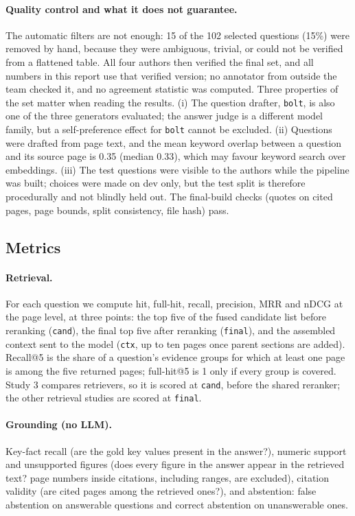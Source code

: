 \documentclass[11pt,a4paper]{article}
\begin{document}
\paragraph{Quality control and what it does not guarantee.} The automatic filters are not enough: 15 of the 102 selected questions (15\%) were removed by hand, because they were ambiguous, trivial, or could not be verified from a flattened table. All four authors then verified the final set, and all numbers in this report use that verified version; no annotator from outside the team checked it, and no agreement statistic was computed. Three properties of the set matter when reading the results. (i) The question drafter, \texttt{bolt}, is also one of the three generators evaluated; the answer judge is a different model family, but a self-preference effect for \texttt{bolt} cannot be excluded. (ii) Questions were drafted from page text, and the mean keyword overlap between a question and its source page is 0.35 (median 0.33), which may favour keyword search over embeddings. (iii) The test questions were visible to the authors while the pipeline was built; choices were made on dev only, but the test split is therefore procedurally and not blindly held out. The final-build checks (quotes on cited pages, page bounds, split consistency, file hash) pass.

\subsection{Metrics}
\paragraph{Retrieval.} For each question we compute hit, full-hit, recall, precision, MRR and nDCG at the page level, at three points: the top five of the fused candidate list before reranking (\texttt{cand}), the final top five after reranking (\texttt{final}), and the assembled context sent to the model (\texttt{ctx}, up to ten pages once parent sections are added). Recall@5 is the share of a question's evidence groups for which at least one page is among the five returned pages; full-hit@5 is 1 only if every group is covered. Study 3 compares retrievers, so it is scored at \texttt{cand}, before the shared reranker; the other retrieval studies are scored at \texttt{final}.

\paragraph{Grounding (no LLM).} Key-fact recall (are the gold key values present in the answer?), numeric support and unsupported figures (does every figure in the answer appear in the retrieved text? page numbers inside citations, including ranges, are excluded), citation validity (are cited pages among the retrieved ones?), and abstention: false abstention on answerable questions and correct abstention on unanswerable ones.
\end{document}
